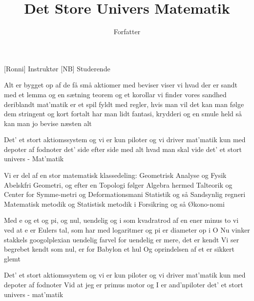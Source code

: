 \documentclass[a4paper,11pt]{article}
\title{Det Store Univers Matematik}
\author{Forfatter}
\begin{document}
\maketitle

\begin{roles}
[Ronni] Instruktør
[NB] Studerende
\end{roles}

\begin{song}
 Alt er bygget op af de få små aktiomer
med beviser viser vi hvad der er sandt
med et lemma og en sætning teorem og et korollar
vi finder vores sandhed deriblandt
mat'matik er et spil fyldt med regler, hvis man vil det
kan man følge dem stringent og kort fortalt
har man lidt fantasi, krydderi og en smule held
så kan man jo bevise næsten alt

Det' et stort aktiomssystem
og vi er kun piloter
og vi driver mat'matik
kun med depoter af fodnoter
det' side efter side
med alt hvad man skal vide
det' et stort univers - Mat'matik

Vi er del af en stor matematisk klassedeling:
Geometrisk Analyse og Fysik
Abelskfri Geometri, og efter en Topologi
følger Algebra hermed Talteorik
og Center for Symme-metri og Deformationsmani
Statistik og så Sandsynlig regneri
Matematisk metodik og Statistisk metodik
i Forsikring og så Økono-nomi

Med e og et og pi, og nul, uendelig og i
som kvadratrod af en ener minus to
vi ved at e er Eulers tal, som har med logaritmer
og pi er diameter op i O
Nu vinker stakkels googolplexian uendelig farvel
for uendelig er mere, det er kendt
Vi ser begrebet kendt som nul, er for Babylon et hul
Og oprindelsen af et er sikkert glemt

Det' et stort aktiomssystem
og vi er kun piloter
og vi driver mat'matik
kun med depoter af fodnoter
Vid at jeg er primus motor
og I er and'npiloter
det' et stort univers - mat'matik
\end{song}
\end{document}
